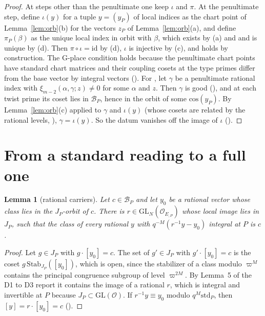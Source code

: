 \documentclass[11pt]{article}
\newcommand{\OEr}{\mathcal O_E}
\newcommand{\Ok}{\mathcal O}
\newcommand{\GL}{\mathrm{GL}}
\newcommand{\Bx}{\mathcal B}
\newtheorem{lemma}[theorem]{Lemma}
\theoremstyle{remark}
\begin{document}
\begin{proof}
At steps other than the penultimate one keep $\iota$ and $\pi$. At the penultimate step, define $\iota(y)$ for a tuple $y=(y_P)$ of local indices as the chart point of Lemma~\ref{lem:orb}(b) for the vectors $z_P$ of Lemma~\ref{lem:orb}(a), and define $\pi_P(\beta)$ as the unique local index in orbit with $\beta$, which exists by (a) and  and is unique by (d). Then $\pi\circ\iota=\mathrm{id}$ by (d), $\iota$ is injective by (c), and  holds by construction. The G-place condition  holds because the penultimate chart points have standard chart matrices and their coupling cosets at the type primes differ from the base vector by integral vectors (). For , let $\gamma$ be a penultimate rational index with $\xi_{m-2}(\alpha,\gamma;z)\ne0$ for some $\alpha$ and $z$. Then $\gamma$ is good (), and at each twist prime its coset lies in $\Bx_P$, hence in the orbit of some $\mathrm{cos}(y_P)$. By Lemma~\ref{lem:orb}(c) applied to $\gamma$ and $\iota(y)$ (whose cosets are related by the rational levels, ), $\gamma=\iota(y)$. So the datum vanishes off the image of $\iota$ ().
\end{proof}

\section{From a standard reading to a full one}

\begin{lemma}[rational carriers]\label{lem:carry}
Let $c\in\Bx_P$ and let $y_0$ be a rational vector whose class lies in the $J_P$-orbit of $c$. There is $r\in\GL_N(\OEr_{,P})$ whose local image lies in $J_P$, such that the class of every rational $y$ with $q^{-M}(r^{-1}y-y_0)$ integral at $P$ is $c$.
\end{lemma}

\begin{proof}
Let $g\in J_P$ with $g\cdot[y_0]=c$. The set of $g'\in J_P$ with $g'\cdot[y_0]=c$ is the coset $g\,\mathrm{Stab}_{J_P}([y_0])$, which is open, since the stabilizer of a class modulo $\varpi^{M}$ contains the principal congruence subgroup of level $\varpi^{2M}$. By Lemma~5 of the D1 to D3 report it contains the image of a rational $r$, which is integral and invertible at $P$ because $J_P\subset\GL(\Ok)$. If $r^{-1}y\equiv y_0$ modulo $q^{M}\mathrm{std}_P$, then $[y]=r\cdot[y_0]=c$ ().
\end{proof}
\end{document}
